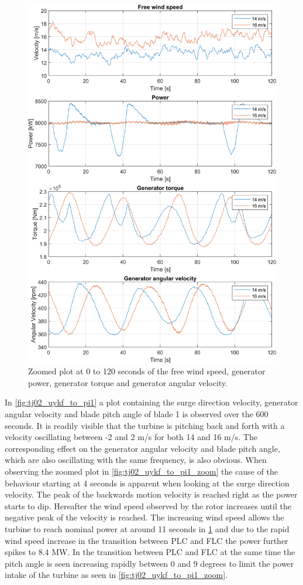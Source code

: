 \begin{figure}[ht]
	\centering
	\includegraphics[width=0.8\linewidth]{Graphics/TestResults/tj02/vhfree_power_genmom_omgen_zoom.png}
	\caption{Zoomed plot at 0 to 120 seconds of the free wind speed, generator power, generator torque and generator angular velocity.}
	\label{fig:tj02_vfree_to_genangvel_zoom}
\end{figure}
\clearpage
In \cref{fig:tj02_uykf_to_pi1} a plot containing the surge direction velocity, generator angular velocity and blade pitch angle of blade 1 is observed over the 600 seconds. It is readily visible that the turbine is pitching back and forth with a velocity oscillating between -2 and 2 m/s for both 14 and 16 m/s. The corresponding effect on the generator angular velocity and blade pitch angle, which are also oscillating with the same frequency, is also obvious. When observing the zoomed plot in \cref{fig:tj02_uykf_to_pi1_zoom} the cause of the behaviour starting at 4 seconds is apparent when looking at the surge direction velocity. The peak of the backwards motion velocity is reached right as the power starts to dip. Hereafter the wind speed observed by the rotor increases until the negative peak of the velocity is reached. The increasing wind speed allows the turbine to reach nominal power at around 11 seconds in \cref{fig:tj02_vfree_to_genangvel_zoom} and due to the rapid wind speed increase in the transition between PLC and FLC the power further spikes to 8.4 MW. In the transition between PLC and FLC at the same time the pitch angle is seen increasing rapidly between 0 and 9 degrees to limit the power intake of the turbine as seen in \cref{fig:tj02_uykf_to_pi1_zoom}.

